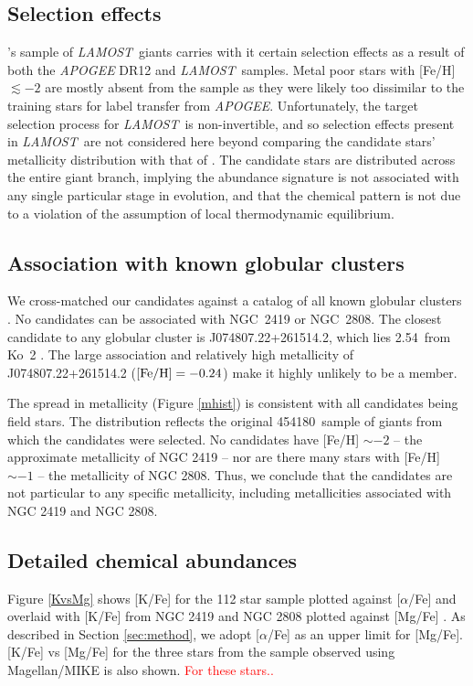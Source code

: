 \documentclass[a4paper,fleqn,usenatbib]{mnras}
\newcommand{\todo}[1]{\textcolor{red}{#1}}
\newcommand{\LamostGiants}{454180}
\newcommand{\project}[1]{\emph{#1}}
\newcommand{\lamost}{\project{LAMOST}}
\begin{document}
\subsection{Selection effects}
\label{sec:selectioneffects}
\cite{ho2017}'s sample of \lamost\ giants carries with it certain selection effects as a result of both the \textit{APOGEE} DR12 and \lamost\ samples. Metal poor stars with [Fe/H] $\lesssim-2$ are mostly absent from the sample as they were likely too dissimilar to the training stars for label transfer from \textit{APOGEE}. Unfortunately, the target selection process for \lamost\ is non-invertible, and so selection effects present in \lamost\ are not considered here beyond comparing the candidate stars' metallicity distribution with that of \cite{ho2017}.  The candidate stars are distributed across the entire giant branch, implying the abundance signature is not associated with any single particular stage in evolution, and that the chemical pattern is not due to a violation of the assumption of local thermodynamic equilibrium.

\subsection{Association with known globular clusters}
\label{sec:globclustasoc}
We cross-matched our candidates against a catalog of all known globular clusters \citep{harris1996}. No candidates can be associated with NGC~2419 or NGC~2808. The closest candidate to any globular cluster is J074807.22+261514.2, which lies 2.54\degree\ from Ko~2 \citep{koposov2007}. The large association and relatively  high metallicity of J074807.22+261514.2 ($[{\rm Fe}/{\rm H}] = -0.24$) make it highly unlikely to be a member. 

The spread in metallicity (Figure \ref{mhist}) is consistent with all candidates being field stars. The distribution reflects the original \LamostGiants\ sample of giants from which the candidates were selected.
No candidates have [Fe/H] $\sim -2$ -- the approximate metallicity of NGC 2419 -- nor are there many stars with [Fe/H] $\sim -1$ -- the metallicity of NGC 2808. Thus, we conclude that the candidates are not particular to any specific metallicity, including metallicities associated with NGC 2419 and NGC 2808.


\subsection{Detailed chemical abundances}
\label{sec:abundances}
Figure \ref{KvsMg} shows [K/Fe]  for the 112 star sample plotted against $[\alpha$/Fe] and overlaid with [K/Fe] from NGC 2419 and NGC 2808 plotted against [Mg/Fe] \citep{cohenkirby2012, mucciarelli2012, mucciarelli2015}. As described in Section \ref{sec:method}, we adopt [$\alpha$/Fe] as an upper limit for [Mg/Fe]. [K/Fe] vs [Mg/Fe] for the three stars from the sample observed using Magellan/MIKE is also shown. \todo{For these stars..}
\end{document}
